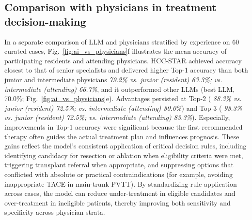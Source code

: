\documentclass{article}
\begin{document}


\subsection{Comparison with physicians in treatment decision-making}
In a separate comparison of LLM and physicians stratified by experience on 60 curated cases, Fig.~\ref{fig:ai_vs_physicians}f illustrates the mean accuracy of participating residents and attending physicians. {HCC-STAR} achieved accuracy closest to that of senior specialists and delivered higher Top-1 accuracy than both junior and intermediate physicians \textit{79.2\% vs. junior (resident) 63.3\%; vs. intermediate (attending) 66.7\%}, and it outperformed other LLMs (best LLM, 70.0\%; Fig.~\ref{fig:ai_vs_physicians}e). Advantages persisted at Top-2 (\textit{ 88.3\% vs. junior (resident) 72.5\%; vs. intermediate (attending) 80.0\%}) and Top-3 (\textit{ 98.3\% vs. junior (resident) 72.5\%; vs. intermediate (attending) 83.3\%}). Especially, improvements in Top-1 accuracy were significant because the first recommended therapy often guides the actual treatment plan and influences prognosis. 
These gains reflect the model’s consistent application of critical decision rules, including identifying candidacy for resection or ablation when eligibility criteria were met, triggering transplant referral when appropriate, and suppressing options that conflicted with absolute or practical contraindications (for example, avoiding inappropriate TACE in main-trunk PVTT). By standardizing rule application across cases, the model can reduce under-treatment in eligible candidates and over-treatment in ineligible patients, thereby improving both sensitivity and specificity across physician strata.
\end{document}
